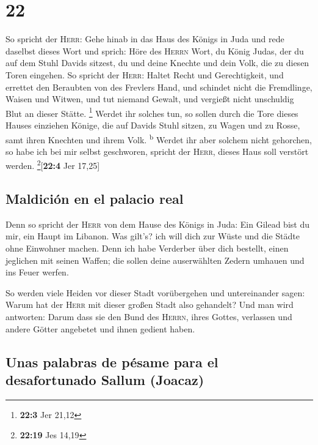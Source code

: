 \hypertarget{section-21}{%
\section{22}\label{section-21}}

 So spricht der \textsc{Herr}: Gehe hinab in das Haus des
Königs in Juda und rede daselbst dieses Wort  und sprich:
Höre des \textsc{Herrn} Wort, du König Judas, der du auf dem Stuhl
Davids sitzest, du und deine Knechte und dein Volk, die zu diesen Toren
eingehen.  So spricht der \textsc{Herr}: Haltet Recht und
Gerechtigkeit, und errettet den Beraubten von des Frevlers Hand, und
schindet nicht die Fremdlinge, Waisen und Witwen, und tut niemand
Gewalt, und vergießt nicht unschuldig Blut an dieser Stätte. \footnote{\textbf{22:3}
  Jer 21,12}  Werdet ihr solches tun, so sollen durch die
Tore dieses Hauses einziehen Könige, die auf Davids Stuhl sitzen, zu
Wagen und zu Rosse, samt ihren Knechten und ihrem Volk.
\textsuperscript{b}  Werdet ihr aber solchem nicht
gehorchen, so habe ich bei mir selbst geschworen, spricht der
\textsc{Herr}, dieses Haus soll verstört werden.
\footnote{\textbf{22:19} Jes 14,19}{[}\textbf{22:4} Jer 17,25{]}

\hypertarget{maldiciuxf3n-en-el-palacio-real}{%
\subsection{Maldición en el palacio
real}\label{maldiciuxf3n-en-el-palacio-real}}

 Denn so spricht der \textsc{Herr} von dem Hause des
Königs in Juda: Ein Gilead bist du mir, ein Haupt im Libanon. Was
gilt's? ich will dich zur Wüste und die Städte ohne Einwohner machen.
 Denn ich habe Verderber über dich bestellt, einen
jeglichen mit seinen Waffen; die sollen deine auserwählten Zedern
umhauen und ins Feuer werfen.

 So werden viele Heiden vor dieser Stadt vorübergehen und
untereinander sagen: Warum hat der \textsc{Herr} mit dieser großen Stadt
also gehandelt?  Und man wird antworten: Darum dass sie
den Bund des \textsc{Herrn}, ihres Gottes, verlassen und andere Götter
angebetet und ihnen gedient haben.

\hypertarget{unas-palabras-de-puxe9same-para-el-desafortunado-sallum-joacaz}{%
\subsection{Unas palabras de pésame para el desafortunado Sallum
(Joacaz)}\label{unas-palabras-de-puxe9same-para-el-desafortunado-sallum-joacaz}}


